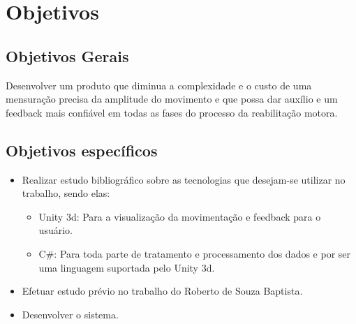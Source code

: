 \section{Objetivos}
\label{Sec:Objetivos}
\subsection{Objetivos Gerais}
\label{Sub:ObjetivosGerais}
  Desenvolver um produto que diminua a complexidade e o custo de uma mensuração
precisa da amplitude do movimento e que possa dar auxílio e um feedback mais
confiável em todas as fases do processo da reabilitação motora.

\subsection{Objetivos específicos}
\label{Sub:ObjetivosEspecificos}
\begin{itemize}

\item Realizar estudo bibliográfico sobre as tecnologias que desejam-se
utilizar no trabalho, sendo elas:
  \begin{itemize}
    \item Unity 3d: Para a visualização da movimentação e feedback para o usuário.
    \item C\#: Para toda parte de tratamento e processamento dos dados e por ser uma linguagem suportada pelo Unity 3d.
  \end{itemize}

\item Efetuar estudo prévio no trabalho do Roberto de Souza Baptista.

\item Desenvolver o sistema.

\end{itemize}

